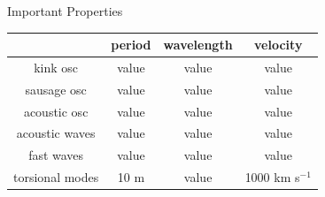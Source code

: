 \documentclass[table]{beamer}
\begin{document}

\begin{frame}{Important Properties}
    \begin{center}
        \begin{tabular}{c|c|c|c|}
            \cline{2-4} & {\textbf{period}} & {\textbf{wavelength}} &
                {\textbf{velocity}}\\
            \hline \multicolumn{0}{|c|}{kink osc} & value & value & value\\
            \hline \multicolumn{0}{|c|}{sausage osc} & value & value & value\\
            \hline \multicolumn{0}{|c|}{acoustic osc} & value & value & value\\
            \hline \multicolumn{0}{|c|}{acoustic waves} & value & value & value\\
            \hline \multicolumn{0}{|c|}{fast waves} & value & value & value\\
            \hline \multicolumn{0}{|c|}{torsional modes} & 10 m & value &
                1000 km s$^{-1}$\\
            \hline
        \end{tabular}
    \end{center}
\end{frame}%
\end{document}
